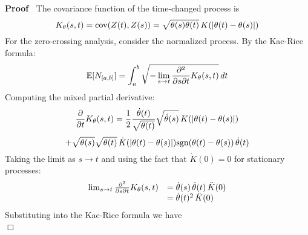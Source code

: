 \documentclass{article}
\newenvironment{proof}{\noindent\textbf{Proof\ }}{\hspace*{\fill}$\Box$\medskip}
\begin{document}
\begin{proof}
  The covariance function of the time-changed process is
  \begin{equation}
    \label{eq:time_changed_cov} K_{\theta} (s, t) = \mathrm{cov} (Z (t), Z
    (s)) = \sqrt{\theta (s) \theta (t)}  \hspace{0.17em} K (| \theta (t) -
    \theta (s) |)
  \end{equation}
  For the zero-crossing analysis, consider the normalized process. By the
  Kac-Rice formula:
  \begin{equation}
    \label{eq:kac_rice_formula} \mathbb{E} [N_{[a, b]}] = \int_a^b \sqrt{-
    \lim_{s \to t}  \frac{\partial^2}{\partial s \partial t} K_{\theta} (s,
    t)}  \hspace{0.17em} dt
  \end{equation}
  Computing the mixed partial derivative:
  \begin{equation}
    \label{eq:mixed_partial} \frac{\partial}{\partial t} K_{\theta} (s, t) =
    \frac{1}{2}  \frac{\dot{\theta} (t)}{\sqrt{\theta (t)}} 
    \sqrt{\dot{\theta} (s)}  \hspace{0.17em} K (| \theta (t) - \theta (s) |)
  \end{equation}
  \begin{equation}
    \label{eq:mixed_partial_continued} + \sqrt{\theta (s)}  \sqrt{\theta (t)} 
    \hspace{0.17em} \dot{K} (| \theta (t) - \theta (s) |) \mathrm{sgn} (\theta
    (t) - \theta (s))  \hspace{0.17em} \dot{\theta} (t)
  \end{equation}
  Taking the limit as $s \to t$ and using the fact that $\dot{K} (0) = 0$ for
  stationary processes:
  \begin{equation}
    \begin{array}{ll}
      \lim_{s \to t}  \frac{\partial^2}{\partial s \partial t} K_{\theta} (s,
      t) & = \dot{\theta} (s) \hspace{0.17em} \dot{\theta} (t) 
      \hspace{0.17em} \ddot{K} (0)\\
      & = \dot{\theta} (t)^2  \hspace{0.17em} \ddot{K} (0)
    \end{array} \label{eq:limit_mixed_partial}
  \end{equation}
  Substituting into the Kac-Rice formula we have
  \begin{equation}
    \label{eq:substituted_kac_rice} \begin{array}{ll}

\end{array}
\end{equation}
\end{proof}
\end{document}

